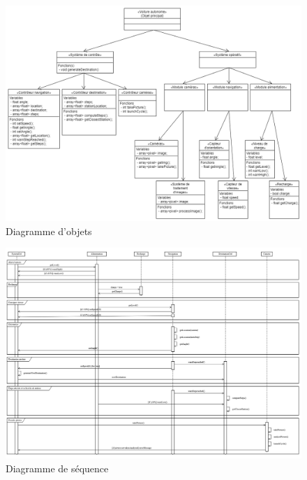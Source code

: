 \documentclass[conference]{IEEEtran}
\begin{document}
\begin{figure}[h!]
    \centering
    \includegraphics[width=\paperwidth, angle=90]{objects.png}
    \caption{Diagramme d'objets}
    \label{fig:object}
\end{figure}

\begin{figure}[h!]
    \hspace{-3em}
    \includegraphics[width=1.2\paperwidth, angle=90]{sequence-diagram.png}
    \caption{Diagramme de séquence}
    \label{fig:sequence}
\end{figure}
\end{document}
